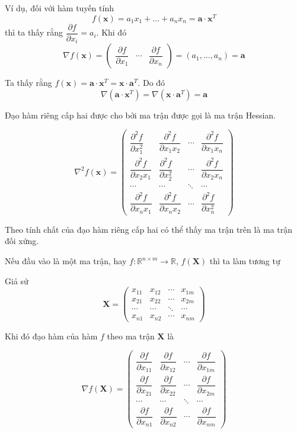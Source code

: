 \documentclass{mynotes}
\newcommand{\RR}{\mathbb{R}}
\begin{document}
Ví dụ, đối với hàm tuyến tính \[ f(\bm{x}) = a_1 x_1 + \ldots + a_n x_n = \bm{a} \cdot \bm{x}^T \] thì ta thấy rằng $\dfrac{\partial f}{\partial x_i} = a_i$. Khi đó \[ \nabla f (\bm{x}) = \begin{pmatrix}
    \dfrac{\partial f}{\partial x_1} & \cdots & \dfrac{\partial f}{\partial x_n}
\end{pmatrix} = (a_1, \ldots, a_n) = \bm{a}\]

Ta thấy rằng $f(\bm{x}) = \bm{a} \cdot \bm{x}^T = \bm{x} \cdot \bm{a}^T$. Do đó \[\nabla (\bm{a} \cdot \bm{x}^T) = \nabla (\bm{x} \cdot \bm{a}^T) = \bm{a}\]

Đạo hàm riêng cấp hai được cho bởi ma trận được gọi là ma trận Hessian.

\begin{equation*}
    \nabla^2 f(\bm{x}) = \begin{pmatrix}
        \dfrac{\partial^2 f}{\partial x_1^2} & \dfrac{\partial^2 f}{\partial x_1 x_2} & \cdots & \dfrac{\partial^2 f}{\partial x_1 x_n} \\ \dfrac{\partial^2 f}{\partial x_2 x_1} & \dfrac{\partial^2 f}{\partial x_2^2} & \cdots & \dfrac{\partial^2 f}{\partial x_2 x_n} \\ \cdots & \cdots & \ddots & \cdots \\ \dfrac{\partial^2 f}{\partial x_n x_1} & \dfrac{\partial^2 f}{\partial x_n x_2} & \cdots & \dfrac{\partial^2 f}{\partial x_n^2}
    \end{pmatrix}
\end{equation*}

Theo tính chất của đạo hàm riêng cấp hai có thể thấy ma trận trên là ma trận đối xứng.

Nếu đầu vào là một ma trận, hay $f: \RR^{n \times m} \to \RR$, $f(\bm{X})$ thì ta làm tương tự

Giả sử \[ \bm{X} = \begin{pmatrix}
    x_{11} & x_{12} & \cdots & x_{1m} \\ x_{21} & x_{22} & \cdots & x_{2m} \\ \cdots & \cdots & \ddots & \cdots \\ x_{n1} & x_{n2} & \cdots & x_{nm}
\end{pmatrix} \]

Khi đó đạo hàm của hàm $f$ theo ma trận $\bm{X}$ là

\begin{equation*}
    \nabla f(\bm{X}) = \begin{pmatrix}
        \dfrac{\partial f}{\partial x_{11}} & \dfrac{\partial f}{\partial x_{12}} & \cdots & \dfrac{\partial f}{\partial x_{1m}} \\ \dfrac{\partial f}{\partial x_{21}} & \dfrac{\partial f}{\partial x_{22}} & \cdots & \dfrac{\partial f}{\partial x_{2m}} \\ \cdots & \cdots & \ddots & \cdots \\ \dfrac{\partial f}{\partial x_{n1}} & \dfrac{\partial f}{\partial x_{n2}} & \cdots & \dfrac{\partial f}{\partial x_{nm}}
    \end{pmatrix}
\end{equation*}
\end{document}
